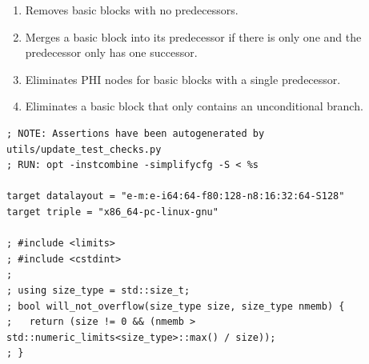 \documentclass[a4paper]{exam}
\theoremstyle{definition}
\begin{document}
\begin{enumerate}
  \item Removes basic blocks with no predecessors.
  \item Merges a basic block into its predecessor if there is only one and the predecessor only has one successor.
  \item Eliminates PHI nodes for basic blocks with a single predecessor.
  \item Eliminates a basic block that only contains an unconditional branch.
\end{enumerate}

\begin{verbatim}
; NOTE: Assertions have been autogenerated by utils/update_test_checks.py
; RUN: opt -instcombine -simplifycfg -S < %s 

target datalayout = "e-m:e-i64:64-f80:128-n8:16:32:64-S128"
target triple = "x86_64-pc-linux-gnu"

; #include <limits>
; #include <cstdint>
;
; using size_type = std::size_t;
; bool will_not_overflow(size_type size, size_type nmemb) {
;   return (size != 0 && (nmemb > std::numeric_limits<size_type>::max() / size));
; }


\end{verbatim}
\end{document}
